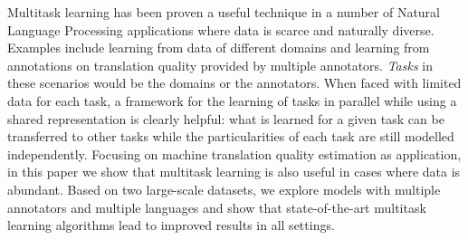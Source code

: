 Multitask learning has been proven a useful technique in a number of Natural Language Processing applications where data is scarce and naturally diverse. Examples include learning from data of different domains and learning from annotations on translation quality provided by multiple annotators. {\em Tasks} in these scenarios would be the domains or the annotators. When faced with limited data for each task, a framework for the learning of tasks in parallel while using a shared representation is clearly helpful: what is learned for a given task can be transferred to other tasks while the particularities of each task are still modelled independently. Focusing on machine translation quality estimation as application, in this paper we show that multitask learning is also useful in cases where data is abundant. Based on two large-scale datasets, we explore models with multiple annotators and multiple languages and show that state-of-the-art multitask learning algorithms lead to improved results in all settings.
